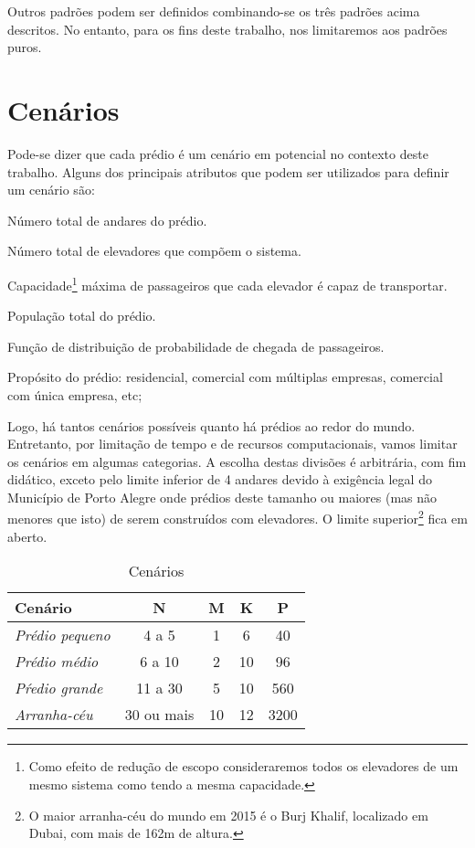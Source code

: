 Outros padrões podem ser definidos combinando-se os três padrões acima
descritos. No entanto, para os fins deste trabalho, nos limitaremos aos padrões puros.

\section{Cenários}

Pode-se dizer que cada prédio é um cenário em potencial no contexto deste trabalho. Alguns dos principais atributos que podem ser utilizados para definir um cenário são:

\begin{description}[leftmargin=!,labelwidth=\widthof{\bfseries Propósito}]
  \item[N]
  Número total de andares do prédio.
  \item[M]
  Número total de elevadores que compõem o sistema.
  \item[K]
  Capacidade\footnote{Como efeito de redução de escopo consideraremos todos os elevadores de um mesmo sistema como tendo a mesma capacidade.} máxima de passageiros que cada elevador é capaz de transportar.
  \item[P]
  População total do prédio.
  \item[F]
  Função de distribuição de probabilidade de chegada de passageiros.
  \item[Propósito]
  Propósito do prédio: residencial, comercial com múltiplas empresas, comercial com única empresa, etc;
\end{description}

Logo, há tantos cenários possíveis quanto há prédios ao redor do mundo. Entretanto, por limitação de tempo e de recursos computacionais, vamos limitar os cenários em algumas categorias. A escolha destas divisões é arbitrária, com fim didático, exceto pelo limite inferior de 4 andares devido à exigência legal do Município de Porto Alegre onde prédios deste tamanho ou maiores (mas não menores que isto) de serem construídos com elevadores. O limite superior\footnote{O maior arranha-céu do mundo em 2015 é o Burj Khalif, localizado em Dubai, com mais de 162m de altura.} fica em aberto.


\begin{table}[htb!]
\centering
\caption{Cenários}
\label{table:tab1}
\begin{tabular}{|l|c|c|c|c|}
\hline
{\bf Cenário}        & {\bf N}    & {\bf M} & {\bf K} & {\bf P} \\ \hline
{\it Prédio pequeno} & 4 a 5      & 1       & 6       & 40      \\ \hline
{\it Prédio médio}   & 6 a 10     & 2       & 10      & 96      \\ \hline
{\it Pŕedio grande}  & 11 a 30    & 5       & 10      & 560     \\ \hline
{\it Arranha-céu}    & 30 ou mais & 10      & 12      & 3200    \\ \hline
\end{tabular}
\end{table}

